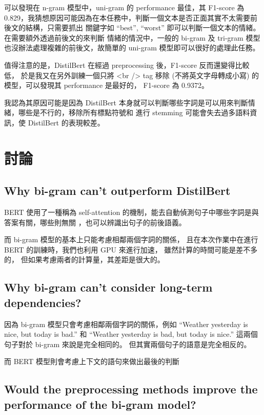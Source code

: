 \documentclass{article}[12pt]
\begin{document}
可以發現在 n-gram 模型中，uni-gram 的 performance 最佳，其 F1-score 為 0.829，我猜想原因可能因為在本任務中，判斷一個文本是否正面其實不太需要前後文的結構，只需要抓出
關鍵字如 ``best'', ``worst'' 即可以判斷一個文本的情緒。在需要額外透過前後文的來判斷
情緒的情況中，一般的 bi-gram 及 tri-gram 模型也沒辦法處理複雜的前後文，故簡單的 uni-gram 
模型即可以很好的處理此任務。

值得注意的是，DistilBert 在經過 preprocessing 後，F1-score 反而還變得比較低，
於是我又在另外訓練一個只將 <br /> tag 移除 (不將英文字母轉成小寫) 的模型，可以發現其 performance 是最好的，
F1-score 為 0.9372。

我認為其原因可能是因為 DistilBert 本身就可以判斷哪些字詞是可以用來判斷情緒，哪些是不行的，移除所有標點符號和
進行 stemming 可能會失去過多語料資訊，使 DistilBert 的表現較差。


\section{討論}
\subsection{Why bi-gram can't outperform DistilBert}

BERT 使用了一種稱為 self-attention 的機制，能去自動偵測句子中哪些字詞是與答案有關，哪些則無關
，也可以辨識出句子的前後語義。

而 bi-gram 模型的基本上只能考慮相鄰兩個字詞的關係，
且在本次作業中在進行 BERT 的訓練時，我們也利用 GPU 來進行加速，
雖然計算的時間可能是差不多的，
但如果考慮兩者的計算量，其差距是很大的。

\subsection{Why bi-gram can't consider long-term dependencies?}

因為 bi-gram 模型只會考慮相鄰兩個字詞的關係，例如 ``Weather yesterday is nice, but today is bad.'' 和
``Weather yesterday is bad, but today is nice.'' 這兩個句子對於 bi-gram 來說是完全相同的。
但其實兩個句子的語意是完全相反的。

而 BERT 模型則會考慮上下文的語句來做出最後的判斷

\subsection{Would the preprocessing methods improve the performance of the bi-gram model?}
\end{document}
